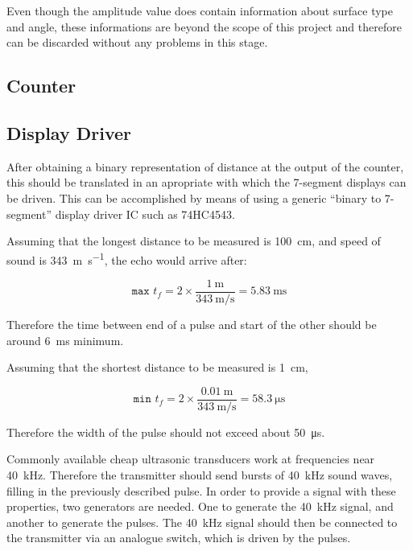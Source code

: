 \documentclass[12pt, a4paper]{article}
\begin{document}
	Even though the amplitude value does contain information about surface type and angle, these informations are beyond the scope of this project and therefore can be discarded without any problems in this stage.
	
	\subsection{Counter}
	
	\subsection{Display Driver}
	After obtaining a binary representation of distance at the output of the counter, this should be translated in an apropriate with which the 7-segment displays can  be driven. This can be accomplished by means of using a generic “binary to 7-segment” display driver IC such as 74HC4543.
	
    
   \pagebreak
    Assuming that the longest distance to be measured is \SI{100}{\centi\metre}, and speed of sound is \SI{343}{\metre\per\second}, the echo would arrive after:

    \begin{equation}
        \texttt{max }t_f = 2 \times \frac{\SI{1}{\metre}}{\SI{343}{\metre\per\second}} = \SI{5.83}{\milli\second}
    \end{equation}

    \noindent Therefore the time between end of a pulse and start of the other should be around \SI{6}{\milli\second} minimum. 

    \noindent Assuming that the shortest distance to be measured is \SI{1}{\centi\metre}, 

    \begin{equation}
        \texttt{min }t_f = 2 \times \frac{\SI{0.01}{\metre}}{\SI{343}{\metre\per\second}} = \SI{58.3}{\micro\second}
    \end{equation}

    \noindent Therefore the width of the pulse should not exceed about \SI{50}{\micro\second}.


    \bigskip
    Commonly available cheap ultrasonic transducers work at frequencies near \SI{40}{\kilo\hertz}. Therefore the transmitter should send bursts of \SI{40}{\kilo\hertz} sound waves, filling in the previously described pulse. In order to provide a signal with these properties, two generators are needed. One to generate the \SI{40}{\kilo\hertz} signal, and another to generate the pulses. The \SI{40}{\kilo\hertz} signal should then be connected to the transmitter via an analogue switch, which is driven by the pulses.
    
\end{document}
